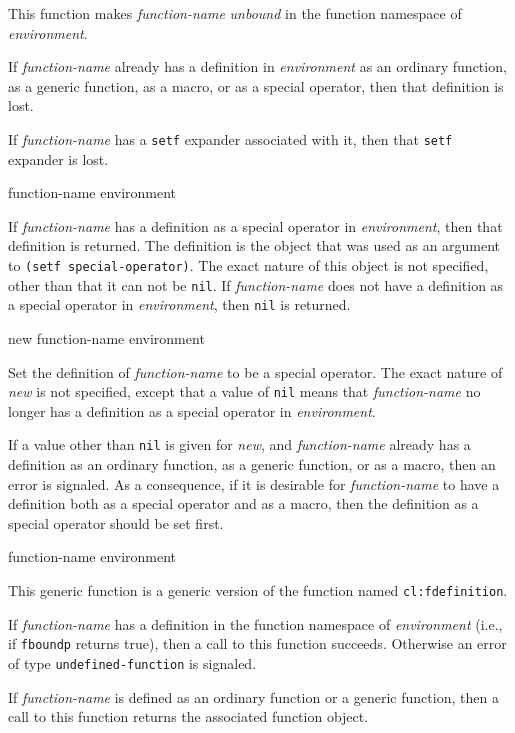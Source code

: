 This function makes \textit{function-name} \emph{unbound} in the
function namespace of \textit{environment}.

If \textit{function-name} already has a definition in
\textit{environment} as an ordinary function, as a generic function,
as a macro, or as a special operator, then that definition is lost.

If \textit{function-name} has a \texttt{setf} expander associated with
it, then that \texttt{setf} expander is lost.

 {function-name environment}

If \textit{function-name} has a definition as a special operator in
\textit{environment}, then that definition is returned.  The
definition is the object that was used as an argument to \texttt{(setf
  special-operator)}.  The exact nature of this object is not
specified, other than that it can not be \texttt{nil}.  If
\textit{function-name} does not have a definition as a special
operator in \textit{environment}, then \texttt{nil} is returned.

 {new function-name environment}

Set the definition of \textit{function-name} to be a special operator.
The exact nature of \textit{new} is not specified, except that a
value of \texttt{nil} means that \textit{function-name} no longer has
a definition as a special operator in \textit{environment}.

If a value other than \texttt{nil} is given for \textit{new}, and
\textit{function-name} already has a definition as an ordinary
function, as a generic function, or as a macro, then an error is
signaled.  As a consequence, if it is desirable for
\textit{function-name} to have a definition both as a special operator
and as a macro, then the definition as a special operator should be
set first.

 {function-name environment}

This generic function is a generic version of the \commonlisp{}
function named \texttt{cl:fdefinition}.

If \textit{function-name} has a definition in the function namespace
of \textit{environment} (i.e., if \texttt{fboundp} returns true), then
a call to this function succeeds.  Otherwise an error of type
\texttt{undefined-function} is signaled.

If \textit{function-name} is defined as an ordinary function or a generic
function, then a call to this function returns the associated
function object.

